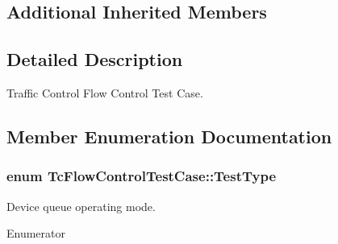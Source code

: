 \subsection*{Additional Inherited Members}


\subsection{Detailed Description}
Traffic Control Flow Control Test Case. 

\subsection{Member Enumeration Documentation}
\subsubsection[{\texorpdfstring{Test\+Type}{TestType}}]{\setlength{\rightskip}{0pt plus 5cm}enum {\bf Tc\+Flow\+Control\+Test\+Case\+::\+Test\+Type}}\hypertarget{classTcFlowControlTestCase_a63146d60b911dd039c9cf960cbddb458}{}\label{classTcFlowControlTestCase_a63146d60b911dd039c9cf960cbddb458}


Device queue operating mode. 

\begin{Desc}
\item[Enumerator]\par
\begin{description}
\item[{\em 
P\+A\+C\+K\+E\+T\+\_\+\+M\+O\+DE\hypertarget{classTcFlowControlTestCase_a63146d60b911dd039c9cf960cbddb458a294d1e27d6e81fc7a19f37ec1f5ba1d8}{}\label{classTcFlowControlTestCase_a63146d60b911dd039c9cf960cbddb458a294d1e27d6e81fc7a19f37ec1f5ba1d8}
}]\item[{\em 
B\+Y\+T\+E\+\_\+\+M\+O\+DE\hypertarget{classTcFlowControlTestCase_a63146d60b911dd039c9cf960cbddb458a10186dff385e013c5c5351795fdf6558}{}\label{classTcFlowControlTestCase_a63146d60b911dd039c9cf960cbddb458a10186dff385e013c5c5351795fdf6558}
}]\end{description}
\end{Desc}

